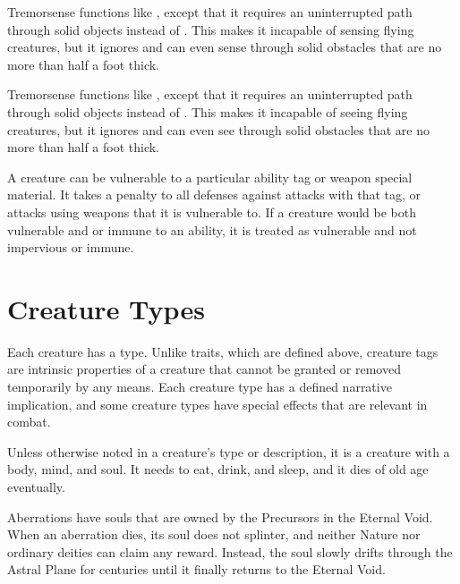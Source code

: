   Tremorsense functions like , except that it requires an uninterrupted path through solid objects instead of .
  This makes it incapable of sensing flying creatures, but it ignores  and can even sense through solid obstacles that are no more than half a foot thick.

  Tremorsense functions like , except that it requires an uninterrupted path through solid objects instead of .
  This makes it incapable of seeing flying creatures, but it ignores  and can even see through solid obstacles that are no more than half a foot thick.

  A creature can be vulnerable to a particular ability tag or weapon special material.
  It takes a  penalty to all defenses against attacks with that tag, or attacks using weapons that it is vulnerable to.
  If a creature would be both vulnerable and \impervious or immune to an ability, it is treated as vulnerable and not impervious or immune.

\newpage
\section{Creature Types}\label{Creature Tags}

  Each creature has a type.
  Unlike traits, which are defined above, creature tags are intrinsic properties of a creature that cannot be granted or removed temporarily by any means.
  Each creature type has a defined narrative implication, and some creature types have special effects that are relevant in combat.

  Unless otherwise noted in a creature's type or description, it is a  creature with a body, mind, and soul.
  It needs to eat, drink, and sleep, and it dies of old age eventually.

  Aberrations have souls that are owned by the Precursors in the Eternal Void.
  When an aberration dies, its soul does not splinter, and neither Nature nor ordinary deities can claim any reward.
  Instead, the soul slowly drifts through the Astral Plane for centuries until it finally returns to the Eternal Void.

